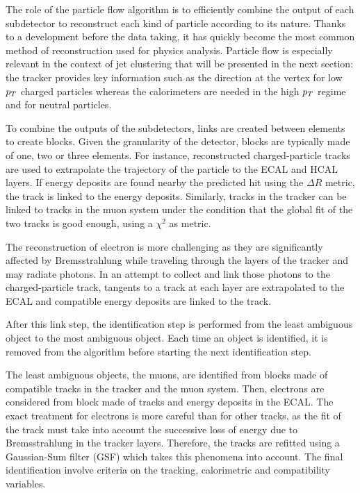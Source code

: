     The role of the particle flow algorithm \cite{particleFlow} is to efficiently combine the output of each
    subdetector to reconstruct each kind of particle according to its nature. Thanks
    to a development before the data taking, it has quickly become the most common
    method of reconstruction used for physics analysis. Particle flow is especially
    relevant in the context of jet clustering that will be presented in the next section:
    the tracker provides key information such as the direction at the vertex for low $p_T$
    charged particles whereas the calorimeters are needed in the high $p_T$ regime
    and for neutral particles.

    To combine the outputs of the subdetectors, links are created between elements
    to create blocks. Given the granularity of the detector, blocks are typically made
    of one, two or three elements. For instance, reconstructed charged-particle tracks
    are used to extrapolate the trajectory of the particle to the ECAL and HCAL layers.
    If energy deposits are found nearby the predicted hit using the $\Delta R$
    metric, the track is linked to the energy deposits. Similarly, tracks in the
    tracker can be linked to tracks in the muon system under the condition that the
    global fit of the two tracks is good enough, using a $\chi^2$ as metric.

    The reconstruction of electron is more challenging as they are significantly
    affected by Bremsstrahlung while traveling through the layers of the tracker
    and may radiate photons. In an attempt to collect and link those photons to the
    charged-particle track, tangents to a track at each layer are extrapolated to the
    ECAL and compatible energy deposits are linked to the track.

    After this link step, the identification step is performed from the least ambiguous
    object to the most ambiguous object. Each time an object is identified, it is
    removed from the algorithm before starting the next identification step.

    The least ambiguous objects, the muons, are identified from blocks made of compatible
    tracks in the tracker and the muon system. Then, electrons are considered from
    block made of tracks and energy deposits in the ECAL. The exact treatment for
    electrons is more careful than for other tracks, as the fit of the track must take
    into account the successive loss of energy due to Bremsstrahlung in the tracker
    layers. Therefore, the tracks are refitted using a Gaussian-Sum filter (GSF)
    \cite{GSFelectrons} which takes this phenomena into account. The final identification
    involve criteria on the tracking, calorimetric and compatibility variables.

